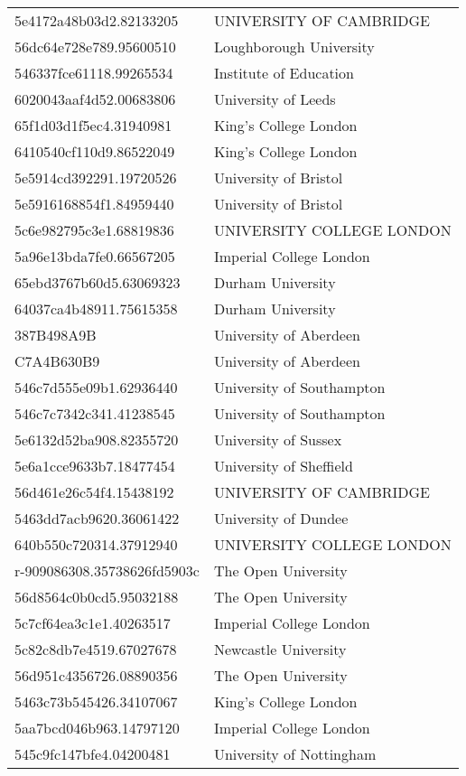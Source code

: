\begin{tabular}{ll}
5e4172a48b03d2.82133205 & UNIVERSITY OF CAMBRIDGE \\
56dc64e728e789.95600510 & Loughborough University \\
546337fce61118.99265534 & Institute of Education \\
6020043aaf4d52.00683806 & University of Leeds \\
65f1d03d1f5ec4.31940981 & King's College London \\
6410540cf110d9.86522049 & King's College London \\
5e5914cd392291.19720526 & University of Bristol \\
5e5916168854f1.84959440 & University of Bristol \\
5c6e982795c3e1.68819836 & UNIVERSITY COLLEGE LONDON \\
5a96e13bda7fe0.66567205 & Imperial College London \\
65ebd3767b60d5.63069323 & Durham University \\
64037ca4b48911.75615358 & Durham University \\
387B498A9B & University of Aberdeen \\
C7A4B630B9 & University of Aberdeen \\
546c7d555e09b1.62936440 & University of Southampton \\
546c7c7342c341.41238545 & University of Southampton \\
5e6132d52ba908.82355720 & University of Sussex \\
5e6a1cce9633b7.18477454 & University of Sheffield \\
56d461e26c54f4.15438192 & UNIVERSITY OF CAMBRIDGE \\
5463dd7acb9620.36061422 & University of Dundee \\
640b550c720314.37912940 & UNIVERSITY COLLEGE LONDON \\
r-909086308.35738626fd5903c & The Open University \\
56d8564c0b0cd5.95032188 & The Open University \\
5c7cf64ea3c1e1.40263517 & Imperial College London \\
5c82c8db7e4519.67027678 & Newcastle University \\
56d951c4356726.08890356 & The Open University \\
5463c73b545426.34107067 & King's College London \\
5aa7bcd046b963.14797120 & Imperial College London \\
545c9fc147bfe4.04200481 & University of Nottingham \\

\end{tabular}
